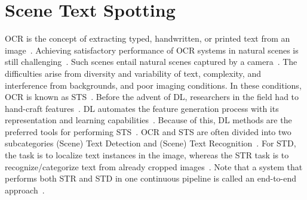 \section{Scene Text Spotting}\label{se:sts}
\ac{OCR} is the concept of extracting typed, handwritten, or printed text
from an image~\citep{zhao_improving_2020}.
Achieving satisfactory performance of \ac{OCR} systems in natural scenes is still
challenging~\citep{zhao_improving_2020, chen_text_2021}.
Such scenes entail natural scenes captured by a camera~\citep{chen_text_2021, baek_what_2019}.
The difficulties arise from diversity and variability of text, complexity, and interference from
backgrounds, and poor imaging conditions.
In these conditions, \ac{OCR} is known as \ac{STS}~\citep{long_scene_2021}.
Before the advent of \ac{DL}, researchers in the field had to hand-craft
features~\citep{long_scene_2021}.
\ac{DL} automates the feature generation process with its representation and learning
capabilities~\citep{long_scene_2021,goodfellow_deep_2016}.
Because of this, \ac{DL} methods are the preferred tools for performing
\ac{STS}~\citep{long_scene_2021}.
\ac{OCR} and \ac{STS} are often divided into two subcategories (Scene) Text Detection and (Scene)
Text Recognition~\citep{zhao_improving_2020, long_scene_2021,chen_text_2021}.
For \ac{STD}, the task is to localize text instances in the image, whereas the \ac{STR} task
is to recognize/categorize text from already cropped images~\citep{chen_text_2021}.
Note that a system that performs both \ac{STR} and \ac{STD} in one continuous pipeline is called
an end-to-end approach~\citep{chen_text_2021}.

